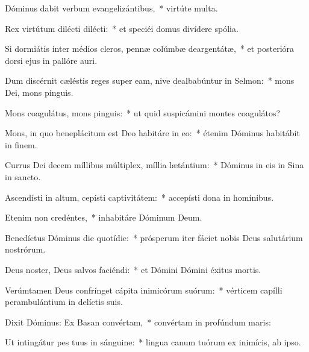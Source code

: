 
\item Dóminus dabit verbum evangelizántibus,~* virtúte multa.

\item Rex virtútum dilécti dilécti:~* et speciéi domus divídere spólia.

\item Si dormiátis inter médios cleros, pennæ colúmbæ deargentátæ,~* et posterióra dorsi ejus in pallóre auri.

\item Dum discérnit cæléstis reges super eam, nive dealbabúntur in Selmon:~* mons Dei, mons pinguis.

\item Mons coagulátus, mons pinguis:~* ut quid suspicámini montes coagulátos?

\item Mons, in quo beneplácitum est Deo habitáre in eo:~* étenim Dóminus habitábit in finem.

\item Currus Dei decem míllibus múltiplex, míllia lætántium:~* Dóminus in eis in Sina in sancto.

\item Ascendísti in altum, cepísti captivitátem:~* accepísti dona in homínibus.

\item Etenim non credéntes,~* inhabitáre Dóminum Deum.

\item Benedíctus Dóminus die quotídie:~* prósperum iter fáciet nobis Deus salutárium nostrórum.

\item Deus noster, Deus salvos faciéndi:~* et Dómini Dómini éxitus mortis.

\item Verúmtamen Deus confrínget cápita inimicórum suórum:~* vérticem capílli perambulántium in delíctis suis.

\item Dixit Dóminus: Ex Basan convértam,~* convértam in profúndum maris:

\item Ut intingátur pes tuus in sánguine:~* lingua canum tuórum ex inimícis, ab ipso.

